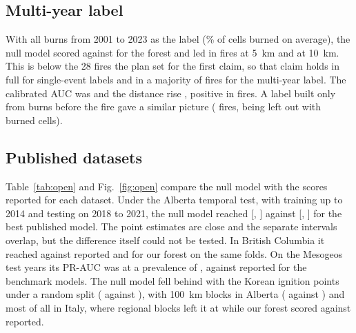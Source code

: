 \documentclass[preprint,12pt,authoryear]{elsarticle}
\begin{document}
\subsection{Multi-year label}
\label{sec:res-multiyear}

With all burns from 2001 to 2023 as the label (\vmyBurned\% of cells burned on average), the null model scored \vmyNull{} against \vmyRf{} for the forest and led in \vmyWins{} fires at 5~km and \vmyWinsTen{} at 10~km. This is below the 28 fires the plan set for the first claim, so that claim holds in full for single-event labels and in a majority of fires for the multi-year label. The calibrated AUC was \vmyCauc{} and the distance rise \vmyRise{}, positive in \vmyRiseFires{} fires. A label built only from burns before the fire gave a similar picture (\vhistWins{} fires, \vhistSkipped{} being left out with \vhistSkippedBurned{} burned cells).

\subsection{Published datasets}
\label{sec:res-open}

Table~\ref{tab:open} and Fig.~\ref{fig:open} compare the null model with the scores reported for each dataset. Under the Alberta temporal test, with training up to 2014 and testing on 2018 to 2021, the null model reached \valNullCi{} [\valNullCiLo, \valNullCiHi] against \valBestCi{} [\valBestCiLo, \valBestCiHi] for the best published model. The point estimates are close and the separate intervals overlap, but the difference itself could not be tested. In British Columbia it reached \vbcNull{} against \vbcRep{} reported and \vbcRf{} for our forest on the same folds. On the Mesogeos test years its PR-AUC was \vmeNullPr{} at a prevalence of \vmePrev{}, against \vmeRepPr{} reported for the benchmark models. The null model fell behind with the Korean ignition points under a random split (\vkoNull{} against \vkoRep{}), with 100~km blocks in Alberta (\valBlockNull{} against \valBlockRep{}) and most of all in Italy, where \vitFolds{} regional blocks left it at \vitNull{} while our forest scored \vitRf{} against \vitRep{} reported.
\end{document}
